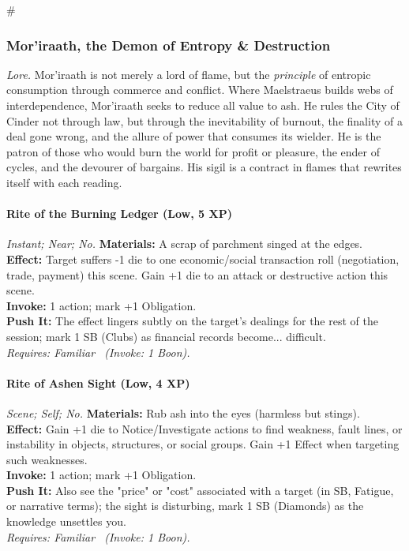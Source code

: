 # %

\subsubsection{Mor'iraath, the Demon of Entropy \& Destruction}
\textit{Lore.} Mor'iraath is not merely a lord of flame, but the \textit{principle} of entropic consumption through commerce and conflict. Where Maelstraeus builds webs of interdependence, Mor'iraath seeks to reduce all value to ash. He rules the City of Cinder not through law, but through the inevitability of burnout, the finality of a deal gone wrong, and the allure of power that consumes its wielder. He is the patron of those who would burn the world for profit or pleasure, the ender of cycles, and the devourer of bargains. His sigil is a contract in flames that rewrites itself with each reading.

\paragraph*{Rite of the Burning Ledger (Low, 5 XP)} \emph{Instant; Near; No.}
\textbf{Materials:} A scrap of parchment singed at the edges.\\
\textbf{Effect:} Target suffers -1 die to one economic/social transaction roll (negotiation, trade, payment) this scene. Gain +1 die to an attack or destructive action this scene.\\
\textbf{Invoke:} 1 action; mark +1 Obligation.\\
\textbf{Push It:} The effect lingers subtly on the target's dealings for the rest of the session; mark 1 SB (Clubs) as financial records become... difficult.\\
\emph{Requires: Familiar \ (\textit{Invoke:} 1 Boon).}

\paragraph*{Rite of Ashen Sight (Low, 4 XP)} \emph{Scene; Self; No.}
\textbf{Materials:} Rub ash into the eyes (harmless but stings).\\
\textbf{Effect:} Gain +1 die to Notice/Investigate actions to find weakness, fault lines, or instability in objects, structures, or social groups. Gain +1 Effect when targeting such weaknesses.\\
\textbf{Invoke:} 1 action; mark +1 Obligation.\\
\textbf{Push It:} Also see the "price" or "cost" associated with a target (in SB, Fatigue, or narrative terms); the sight is disturbing, mark 1 SB (Diamonds) as the knowledge unsettles you.\\
\emph{Requires: Familiar \ (\textit{Invoke:} 1 Boon).}

